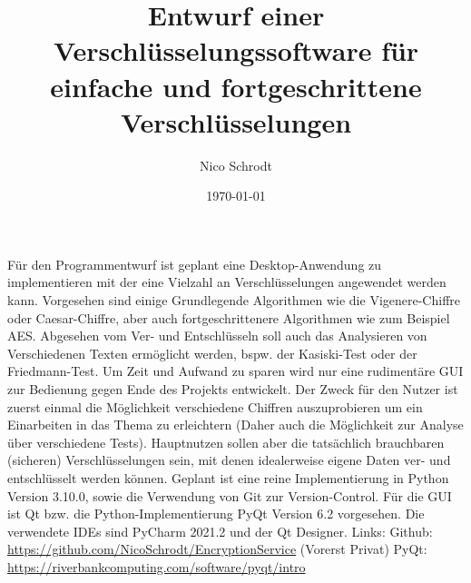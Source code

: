 \documentclass{article}
\title{Entwurf einer Verschlüsselungssoftware für einfache und fortgeschrittene Verschlüsselungen}
\author{Nico Schrodt}
\date{\today}
\begin{document}
	\maketitle
	\noindent Für den Programmentwurf ist geplant eine Desktop-Anwendung zu implementieren mit der eine Vielzahl an Verschlüsselungen angewendet werden kann. Vorgesehen sind einige Grundlegende Algorithmen wie die Vigenere-Chiffre oder Caesar-Chiffre, aber auch fortgeschrittenere Algorithmen wie zum Beispiel AES. Abgesehen vom Ver- und Entschlüsseln soll auch das Analysieren von Verschiedenen Texten ermöglicht werden, bspw. der Kasiski-Test oder der Friedmann-Test. Um Zeit und Aufwand zu sparen wird nur eine rudimentäre GUI zur Bedienung gegen Ende des Projekts entwickelt.\newline  \newline
\noindent
Der Zweck für den Nutzer ist zuerst einmal die Möglichkeit verschiedene Chiffren auszuprobieren um ein Einarbeiten in das Thema zu erleichtern (Daher auch die Möglichkeit zur Analyse über verschiedene Tests). Hauptnutzen sollen aber die tatsächlich brauchbaren (sicheren) Verschlüsselungen sein, mit denen idealerweise eigene Daten ver- und entschlüsselt werden können.\newline  \newline
\noindent
Geplant ist eine reine Implementierung in Python Version 3.10.0, sowie die Verwendung von Git zur Version-Control. Für die GUI ist Qt bzw. die Python-Implementierung PyQt Version 6.2 vorgesehen. Die verwendete IDEs sind PyCharm 2021.2 und der Qt Designer.\newline
\newline
\noindent
Links:\newline
\noindent
Github: \url{https://github.com/NicoSchrodt/EncryptionService}\newline
\noindent
(Vorerst Privat)\newline
\noindent
PyQt: \url{https://riverbankcomputing.com/software/pyqt/intro}
	
\end{document}
